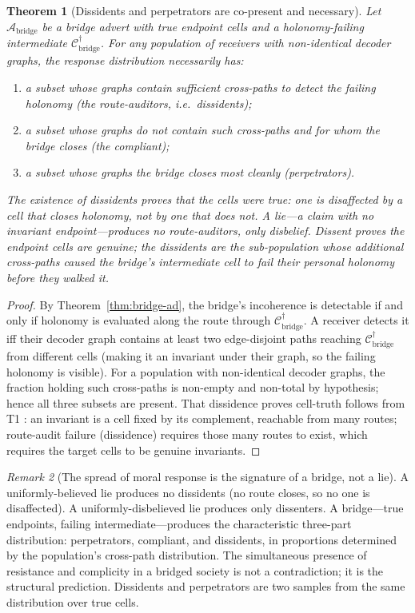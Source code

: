 \documentclass[twocolumn,11pt,a4paper]{article}
\theoremstyle{adv}
\newtheorem{theorem}{Theorem}[section]
\theoremstyle{definition}
\theoremstyle{remark}
\newtheorem{remark}[theorem]{Remark}
\newcommand{\Cell}{\mathcal{C}}        %
\newcommand{\Adv}{\mathcal{A}}        %
\begin{document}
\begin{theorem}[Dissidents and perpetrators are co-present and necessary]
\label{thm:dissidents}
Let $\Adv_\mathrm{bridge}$ be a bridge advert with true endpoint cells and a
holonomy-failing intermediate $\Cell^\dagger_\mathrm{bridge}$. For any
population of receivers with non-identical decoder graphs, the response
distribution necessarily has:
\begin{enumerate}[label=\textup{(\roman*)},leftmargin=2.2em]
\item a subset whose graphs contain sufficient cross-paths to detect the
      failing holonomy (the route-auditors, i.e.\ \emph{dissidents});
\item a subset whose graphs do not contain such cross-paths and for whom the
      bridge closes (the \emph{compliant});
\item a subset whose graphs the bridge closes most cleanly
      (\emph{perpetrators}).
\end{enumerate}
The existence of dissidents proves that the cells were true: one is
disaffected by a cell that closes holonomy, not by one that does not. A
lie---a claim with no invariant endpoint---produces no route-auditors, only
disbelief. Dissent proves the endpoint cells are genuine; the dissidents are
the sub-population whose additional cross-paths caused the bridge's
intermediate cell to fail their personal holonomy before they walked it.
\end{theorem}

\begin{proof}
By Theorem~\ref{thm:bridge-ad}, the bridge's incoherence is detectable if
and only if holonomy is evaluated along the route through
$\Cell^\dagger_\mathrm{bridge}$. A receiver detects it iff their decoder
graph contains at least two edge-disjoint paths reaching
$\Cell^\dagger_\mathrm{bridge}$ from different cells (making it an invariant
under their graph, so the failing holonomy is visible). For a population with
non-identical decoder graphs, the fraction holding such cross-paths is
non-empty and non-total by hypothesis; hence all three subsets are present.
That dissidence proves cell-truth follows from T1
\citep{sachikonye2025contact}: an invariant is a cell fixed by its
complement, reachable from many routes; route-audit failure (dissidence)
requires those many routes to exist, which requires the target cells to be
genuine invariants.
\end{proof}

\begin{remark}[The spread of moral response is the signature of a bridge, not a lie]
A uniformly-believed lie produces no dissidents (no route closes, so no one
is disaffected). A uniformly-disbelieved lie produces only dissenters.
A bridge---true endpoints, failing intermediate---produces the
characteristic three-part distribution: perpetrators, compliant, and
dissidents, in proportions determined by the population's cross-path
distribution. The simultaneous presence of resistance and complicity in a
bridged society is not a contradiction; it is the structural prediction.
Dissidents and perpetrators are two samples from the same distribution over
true cells.
\end{remark}
\end{document}
